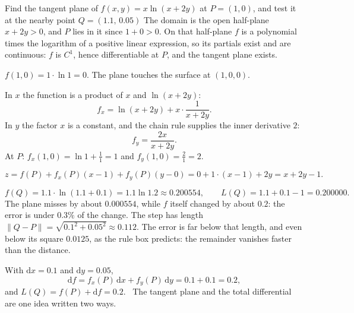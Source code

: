 \begin{worked}{Find the tangent plane of $f(x,y)=x\ln(x+2y)$ at $P=(1,0)$, and test it at the nearby point $Q=(1.1,\,0.05)$}
The domain is the open half-plane $x+2y>0$, and $P$ lies in it since
$1+0>0$. On that half-plane $f$ is a polynomial times the logarithm of a
positive linear expression, so its partials exist and are continuous: $f$
is $C^{1}$, hence differentiable at $P$, and the tangent plane exists.

$f(1,0)=1\cdot\ln1=0$. The plane touches the surface at $(1,0,0)$.

In $x$ the function is a product of $x$ and $\ln(x+2y)$:
\[
  f_{x}=\ln(x+2y)+x\cdot\frac{1}{x+2y} .
\]
In $y$ the factor $x$ is a constant, and the chain rule supplies the inner
derivative $2$:
\[
  f_{y}=\frac{2x}{x+2y} .
\]
At $P$: $f_{x}(1,0)=\ln1+\tfrac11=1$ and $f_{y}(1,0)=\tfrac21=2$.

\[
  z=f(P)+f_{x}(P)(x-1)+f_{y}(P)(y-0)=0+1\cdot(x-1)+2y=x+2y-1 .
\]

\[
  f(Q)=1.1\cdot\ln(1.1+0.1)=1.1\ln1.2\approx0.200554,
  \qquad
  L(Q)=1.1+0.1-1=0.200000 .
\]
The plane misses by about $0.000554$, while $f$ itself changed by about
$0.2$: the error is under $0.3\%$ of the change. The step has length
$\|Q-P\|=\sqrt{0.1^{2}+0.05^{2}}\approx0.112$. The error is far below that
length, and even below its square $0.0125$, as the rule box predicts: the
remainder vanishes faster than the distance.

With $\mathrm{d}x=0.1$ and $\mathrm{d}y=0.05$,
\[
  \mathrm{d}f=f_{x}(P)\,\mathrm{d}x+f_{y}(P)\,\mathrm{d}y=0.1+0.1=0.2,
\]
and $L(Q)=f(P)+\mathrm{d}f=0.2$. \checkmark\ The tangent plane and the
total differential are one idea written two ways.
\end{worked}

